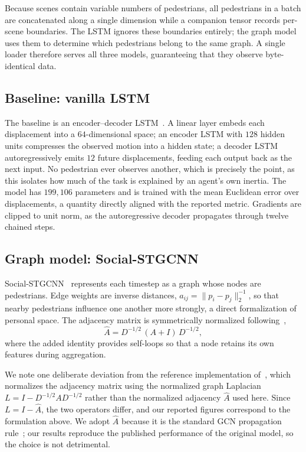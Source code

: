 \documentclass[conference]{IEEEtran}
\begin{document}
Because scenes contain variable numbers of pedestrians, all pedestrians in a batch are
concatenated along a single dimension while a companion tensor records per-scene
boundaries. The LSTM ignores these boundaries entirely; the graph model uses them to
determine which pedestrians belong to the same graph. A single loader therefore serves all
three models, guaranteeing that they observe byte-identical data.

\subsection{Baseline: vanilla LSTM}

The baseline is an encoder--decoder LSTM~\cite{hochreiter1997long}. A linear layer embeds
each displacement into a $64$-dimensional space; an encoder LSTM with $128$ hidden units
compresses the observed motion into a hidden state; a decoder LSTM autoregressively emits
$12$ future displacements, feeding each output back as the next input. No pedestrian ever
observes another, which is precisely the point, as this isolates how much of the task is
explained by an agent's own inertia. The model has $199{,}106$ parameters and is trained
with the mean Euclidean error over displacements, a quantity directly aligned with the
reported metric. Gradients are clipped to unit norm, as the autoregressive decoder
propagates through twelve chained steps.

\subsection{Graph model: Social-STGCNN}

Social-STGCNN~\cite{mohamed2020social} represents each timestep as a graph whose nodes are
pedestrians. Edge weights are inverse distances,
$a_{ij} = \lVert p_i - p_j \rVert_2^{-1}$, so that nearby pedestrians influence one another
more strongly, a direct formalization of personal space. The adjacency matrix is
symmetrically normalized following~\cite{kipf2017semi},
\begin{equation}
\hat{A} = D^{-1/2}\,(A + I)\,D^{-1/2},
\end{equation}
where the added identity provides self-loops so that a node retains its own features
during aggregation.

We note one deliberate deviation from the reference implementation
of~\cite{mohamed2020social}, which normalizes the adjacency matrix using the normalized
graph Laplacian $L = I - D^{-1/2} A D^{-1/2}$ rather than the normalized adjacency
$\hat{A}$ used here. Since $L = I - \hat{A}$, the two operators differ, and our reported
figures correspond to the formulation above. We adopt $\hat{A}$ because it is the
standard GCN propagation rule~\cite{kipf2017semi}; our results reproduce the published
performance of the original model, so the choice is not detrimental.
\end{document}
